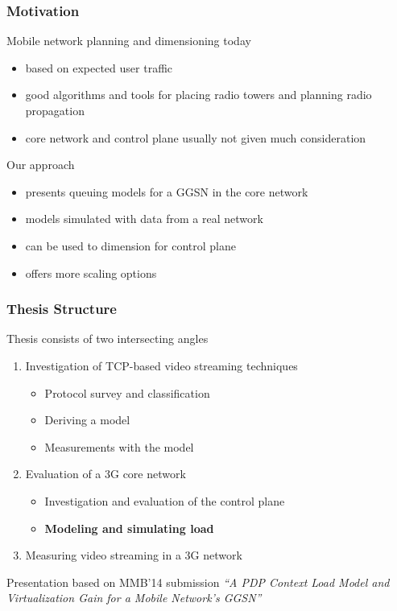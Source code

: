 \documentclass{beamer}
\begin{document}
\begin{frame}
    \frametitle{Motivation}



	Mobile network planning and dimensioning today
    \begin{itemize}
    	\item based on expected user traffic
		\item good algorithms and tools for placing radio towers and planning radio propagation
		\item core network and control plane usually not given much consideration
	\end{itemize}

	Our approach
	\begin{itemize}
		\item presents queuing models for a GGSN in the core network
		\item models simulated with data from a real network
		\item can be used to dimension for control plane
		\item offers more scaling options
	\end{itemize}

\end{frame}




\begin{frame}
	\frametitle{Thesis Structure}

	Thesis consists of two intersecting angles
	\begin{enumerate}
		\item Investigation of TCP-based video streaming techniques
			\begin{itemize}
				\item Protocol survey and classification
				\item Deriving a model
				\item Measurements with the model
			\end{itemize}
		\item Evaluation of a 3G core network
			\begin{itemize}
				\item Investigation and evaluation of the control plane
				\item \textbf{Modeling and simulating load}
			\end{itemize}
		\item Measuring video streaming in a 3G network 
	\end{enumerate}

	Presentation based on MMB'14 submission \textit{``A PDP Context Load Model and Virtualization
Gain for a Mobile Network's GGSN''}

\end{frame}
\end{document}
